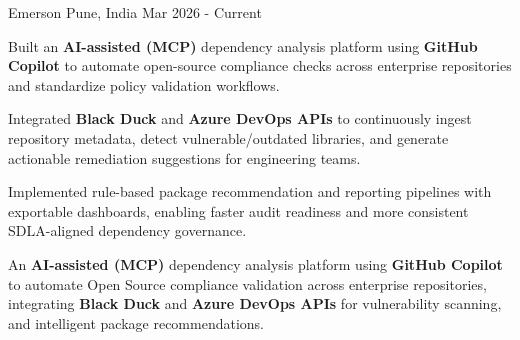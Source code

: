 

\begin{cventries}

  \cventry
    {\ifcv Emerson\else\fi} %
    {} %
    {\ifcv Pune, India\else\fi} %
    {Mar 2026 - Current} %
    {
      \begin{cvitems} %
        \ifcv
          \item {Built an \textbf{AI-assisted (MCP)} dependency analysis platform using \textbf{GitHub Copilot} to automate open-source compliance checks across enterprise repositories and standardize policy validation workflows.}
          \item {Integrated \textbf{Black Duck} and \textbf{Azure DevOps APIs} to continuously ingest repository metadata, detect vulnerable/outdated libraries, and generate actionable remediation suggestions for engineering teams.}
          \item {Implemented rule-based package recommendation and reporting pipelines with exportable dashboards, enabling faster audit readiness and more consistent SDLA-aligned dependency governance.}
        \else
          \item {An \textbf{AI-assisted (MCP)} dependency analysis platform using \textbf{GitHub Copilot} to automate Open Source compliance validation across enterprise repositories, integrating \textbf{Black Duck} and \textbf{Azure DevOps APIs} for vulnerability scanning, and intelligent package recommendations.}
        \fi
      \end{cvitems}
    }


\end{cventries}
